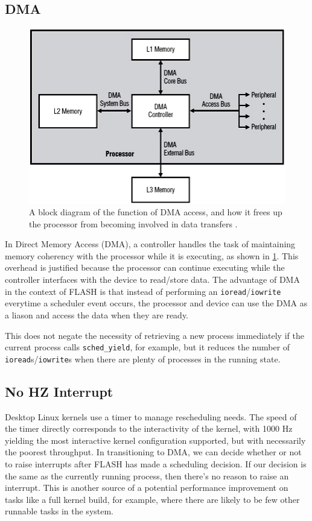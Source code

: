 \documentclass{sig-alternate-10pt}
\begin{document}
\subsection{DMA}
\begin{figure}
	\begin{center}
		\includegraphics[width=0.9\linewidth]{fig/dma.jpg}
		\caption{
			A block diagram of the function of DMA access, and how it frees up the processor from becoming involved in data transfers \protect\cite{fig:dma}.
		}
		\label{fig:dma_diag}
	\end{center}
\end{figure}
In Direct Memory Access (DMA), a controller handles the task of maintaining
memory coherency with the processor while it is executing, as shown in
\ref{fig:dma_diag}. This overhead is justified because the processor can
continue executing while the controller interfaces with the device to
read/store data. The advantage of DMA in the context of FLASH is that
instead of performing an \texttt{ioread}/\texttt{iowrite} everytime a scheduler event occurs,
the processor and device can use the DMA as a liason and access the data
when they are ready.

This does not negate the necessity of retrieving a new process immediately
if the current process calls \verb|sched_yield|, for example, but it reduces
the number of \texttt{ioread}s/\texttt{iowrite}s when there are plenty of processes in the
running state.

\subsection{No HZ Interrupt}
Desktop Linux kernels use a timer to manage rescheduling needs. The speed of the timer directly corresponds to the interactivity of the kernel, with 1000 Hz yielding the most interactive kernel configuration supported, but with necessarily the poorest throughput. In transitioning to DMA, we can decide whether or not to raise interrupts after FLASH has made a scheduling decision. If our decision is the same as the currently running process, then there's no reason to raise an interrupt. This is another source of a potential performance improvement on tasks like a full kernel build, for example, where there are likely to be few other runnable tasks in the system.
\end{document}
